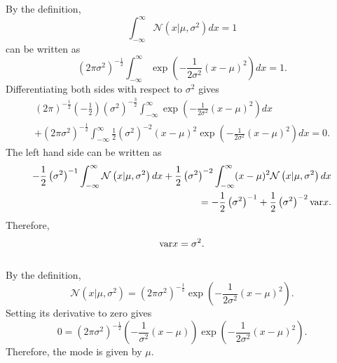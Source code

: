 By the definition,  
%
\begin{equation}
\int_{- \infty}^{\infty} \mathcal{N} \left( x | \mu, \sigma ^ 2 \right) dx = 1
\end{equation}
%
can be written as
%
\begin{equation}
\left( 2 \pi \sigma ^ 2 \right) ^ {-\frac{1}{2}} \int_{-\infty}^{\infty} \exp \left( - \frac{1}{2 \sigma ^ 2} (x - \mu) ^ 2 \right) dx = 1.
\end{equation}
%
Differentiating both sides with respect to $\sigma ^ 2$ gives 
%
\begin{equation}
\begin{aligned}
\left( 2 \pi \right) ^ {-\frac{1}{2}} \left( - \frac{1}{2} \right) \left( \sigma ^ 2 \right) ^ {- \frac{3}{2}} \int_{-\infty}^{\infty} \exp \left( -\frac{1}{2 \sigma ^ 2} (x - \mu) ^ 2 \right) dx \\
+ \left( 2 \pi \sigma ^ 2 \right) ^ {-\frac{1}{2}} \int_{-\infty}^{\infty} \frac{1}{2} \left( \sigma ^ 2 \right) ^ {- 2} (x - \mu) ^ 2 \exp \left( - \frac{1}{2 \sigma ^ 2} (x - \mu) ^ 2 \right) dx = 0.
\end{aligned}
\end{equation}
%
The left hand side can be written as
%
\begin{equation}
\begin{aligned}
- \frac{1}{2} \left( \sigma ^ 2 \right) ^ {- 1} \int_{- \infty}^{\infty} \mathcal{N} \left( x | \mu, \sigma ^ 2 \right) dx + \frac{1}{2} \left( \sigma ^ 2 \right) ^ {- 2} \int_{- \infty} ^ {\infty} (x - \mu) ^ 2 \mathcal{N} \left( x | \mu, \sigma ^ 2 \right) dx \\
= - \frac{1}{2} \left( \sigma ^ 2 \right) ^ {- 1} + \frac{1}{2} \left( \sigma ^ 2 \right) ^ {- 2} {\rm var} x.
\end{aligned}
\end{equation}
%
Therefore,
%
\begin{equation}
{\rm var} x = \sigma ^ 2.
\end{equation}
%


\subsection{}
By the definition,
%
\begin{equation}
\mathcal{N} \left( x | \mu, \sigma ^ 2 \right) = \left( 2 \pi \sigma ^ 2 \right) ^ {- \frac{1}{2}} \exp \left( - \frac{1}{2 \sigma ^ 2} (x - \mu) ^ 2 \right).
\end{equation}
%
Setting its derivative to zero gives
%
\begin{equation}
0 = \left( 2 \pi \sigma ^ 2 \right) ^ {- \frac{1}{2}} \left( - \frac{1}{\sigma ^ 2} (x - \mu) \right) \exp \left( - \frac{1}{2 \sigma ^ 2} (x - \mu) ^ 2 \right).
\end{equation}
%
Therefore, the mode is given by $\mu$.

